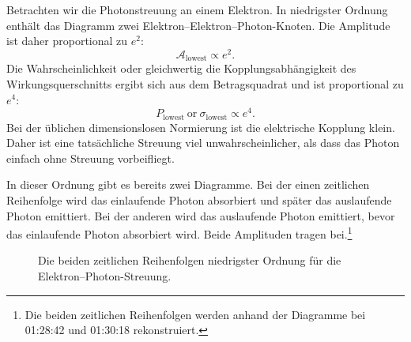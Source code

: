 \begin{classroomqa}
\end{classroomqa}

Betrachten wir die Photonstreuung an einem Elektron. In niedrigster Ordnung enthält das Diagramm zwei Elektron--Elektron--Photon-Knoten. Die Amplitude ist daher proportional zu \(e^2\):
\begin{equation}
\mathcal{A}_{\mathrm{lowest}}\propto e^2.
\end{equation}
Die Wahrscheinlichkeit oder gleichwertig die Kopplungsabhängigkeit des Wirkungsquerschnitts ergibt sich aus dem Betragsquadrat und ist proportional zu \(e^4\):
\begin{equation}
P_{\mathrm{lowest}}\ \text{or}\ \sigma_{\mathrm{lowest}}
\propto e^4.
\end{equation}
Bei der üblichen dimensionslosen Normierung ist die elektrische Kopplung klein. Daher ist eine tatsächliche Streuung viel unwahrscheinlicher, als dass das Photon einfach ohne Streuung vorbeifliegt.

In dieser Ordnung gibt es bereits zwei Diagramme. Bei der einen zeitlichen Reihenfolge wird das einlaufende Photon absorbiert und später das auslaufende Photon emittiert. Bei der anderen wird das auslaufende Photon emittiert, bevor das einlaufende Photon absorbiert wird. Beide Amplituden tragen bei.\footnote{Die beiden zeitlichen Reihenfolgen werden anhand der Diagramme bei 01:28:42 und 01:30:18 rekonstruiert.}

\begin{figure}[htbp]
\centering
{}
\caption{Die beiden zeitlichen Reihenfolgen niedrigster Ordnung für die Elektron--Photon-Streuung.}
\end{figure}


